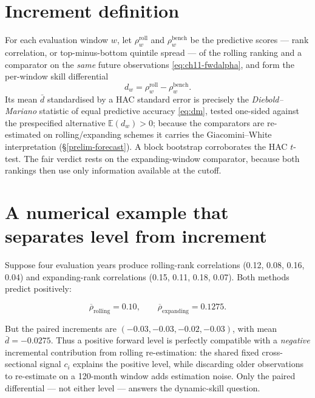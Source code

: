 \hypertarget{increment-definition}{%
\section{Increment definition}\label{increment-definition}}

For each evaluation window $w$, let $\rho^{\mathrm{roll}}_w$ and
$\rho^{\mathrm{bench}}_w$ be the predictive scores --- rank correlation, or
top-minus-bottom quintile spread --- of the rolling ranking and a comparator
on the \emph{same} future observations \eqref{eq:ch11-fwdalpha}, and form
the per-window skill differential
\begin{equation}\label{eq:ch12-increment}
d_w = \rho^{\mathrm{roll}}_w - \rho^{\mathrm{bench}}_w .
\end{equation}
Its mean $\bar d$ standardised by a HAC standard error is precisely the
\emph{Diebold--Mariano} statistic of equal predictive accuracy
\eqref{eq:dm}, tested one-sided against the prespecified alternative
$\mathbb{E}(d_w)>0$; because the comparators are re-estimated on
rolling/expanding schemes it carries the Giacomini--White interpretation
(\S\ref{prelim-forecast}). A block bootstrap corroborates the HAC $t$-test.
The fair verdict rests on the expanding-window comparator, because both
rankings then use only information available at the cutoff.

\hypertarget{a-numerical-example-that-separates-level-from-increment}{%
\section{A numerical example that separates level from
increment}\label{a-numerical-example-that-separates-level-from-increment}}

Suppose four evaluation years produce rolling-rank correlations (0.12,
0.08, 0.16, 0.04) and expanding-rank correlations (0.15, 0.11, 0.18,
0.07). Both methods predict positively:

\begin{equation}\label{eq:ch12-means}
\overline{\rho}_{\mathrm{rolling}} = 0.10,
\qquad
\overline{\rho}_{\mathrm{expanding}} = 0.1275 .
\end{equation}

But the paired increments are $(-0.03,-0.03,-0.02,-0.03)$, with mean
$\bar d=-0.0275$. Thus a positive forward level is perfectly compatible with
a \emph{negative} incremental contribution from rolling re-estimation: the
shared fixed cross-sectional signal $c_i$ explains the positive level, while
discarding older observations to re-estimate on a 120-month window adds
estimation noise. Only the paired differential --- not either level ---
answers the dynamic-skill question.

